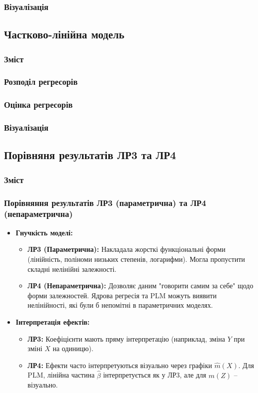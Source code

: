 ﻿\documentclass{beamer}
\begin{document}
\begin{frame}
  \frametitle{Візуалізація}


\end{frame}


\begin{frame}
  \section{Частково-лінійна модель}

  \frametitle{Зміст}
  \tableofcontents[currentsection]
\end{frame}

\begin{frame}
  \frametitle{Розподіл регресорів}


\end{frame}

\begin{frame}
  \frametitle{Оцінка регресорів}

\end{frame}

\begin{frame}
  \frametitle{Візуалізація}


\end{frame}

\begin{frame}
  \section{Порівняня результатів ЛР3 та ЛР4}

  \frametitle{Зміст}
  \tableofcontents[currentsection]
\end{frame}

\begin{frame}
  \frametitle{Порівняння результатів ЛР3 (параметрична) та ЛР4 (непараметрична)}
  \begin{itemize}
    \item \textbf{Гнучкість моделі:}
        \begin{itemize}
            \item \textbf{ЛР3 (Параметрична):} Накладала жорсткі функціональні форми (лінійність, поліноми низьких степенів, логарифми). Могла пропустити складні нелінійні залежності.
            \item \textbf{ЛР4 (Непараметрична):} Дозволяє даним "говорити самим за себе" щодо форми залежностей. Ядрова регресія та PLM можуть виявити нелінійності, які були б непомітні в параметричних моделях.
        \end{itemize}
    \item \textbf{Інтерпретація ефектів:}
        \begin{itemize}
            \item \textbf{ЛР3:} Коефіцієнти мають пряму інтерпретацію (наприклад, зміна $Y$ при зміні $X$ на одиницю).
            \item \textbf{ЛР4:} Ефекти часто інтерпретуються візуально через графіки $\hat{m}(X)$. Для PLM, лінійна частина $\hat{\beta}$ інтерпретується як у ЛР3, але для $m(Z)$ – візуально.
        \end{itemize}
    \end{itemize}
\end{frame}
\end{document}
